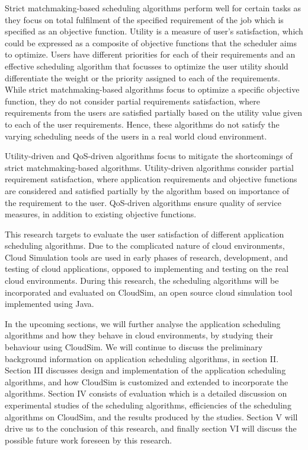 \documentclass[times, 10pt,twocolumn]{article}
\begin{document}
Strict matchmaking-based scheduling algorithms perform well for certain tasks as they focus on total fulfilment of the specified requirement of the job which is specified as an objective function. Utility is a measure of user's satisfaction, which could be expressed as a composite of objective functions that the scheduler aims to optimize. Users have different priorities for each of their requirements and an effective scheduling algorithm that focusses to optimize the user utility should differentiate the weight or the priority assigned to each of the requirements. While strict matchmaking-based algorithms focus to optimize a specific objective function, they do not consider partial requirements satisfaction, where requirements from the users are satisfied partially based on the utility value given to each of the user requirements\cite{resumo}. Hence, these algorithms do not satisfy the varying scheduling needs of the users in a real world cloud environment.

Utility-driven and QoS-driven algorithms focus to mitigate the shortcomings of strict matchmaking-based algorithms. Utility-driven algorithms consider partial requirement satisfaction, where application requirements and objective functions are considered and satisfied partially by the algorithm based on importance of the requirement to the user. QoS-driven algorithms ensure quality of service measures, in addition to existing objective functions. 

This research targets to evaluate the user satisfaction of different application scheduling algorithms. Due to the complicated nature of cloud environments, Cloud Simulation tools are used in early phases of research, development, and testing of cloud applications, opposed to implementing and testing on the real cloud environments. During this research, the scheduling algorithms will be incorporated and evaluated on CloudSim\cite{cloudsim}, an open source cloud simulation tool implemented using Java. 

In the upcoming sections, we will further analyse the application scheduling algorithms and how they behave in cloud environments, by studying their behaviour using CloudSim. We will continue to discuss the preliminary background information on application scheduling algorithms, in section II. Section III discusses design and implementation of the application scheduling algorithms, and how CloudSim is customized and extended to incorporate the algorithms. Section IV consists of evaluation which is a detailed discussion on experimental studies of the scheduling algorithms, efficiencies of the scheduling algorithms on CloudSim, and the results produced by the studies. Section V will drive us to the conclusion of this research, and finally section VI will discuss the possible future work foreseen by this research.
\end{document}

